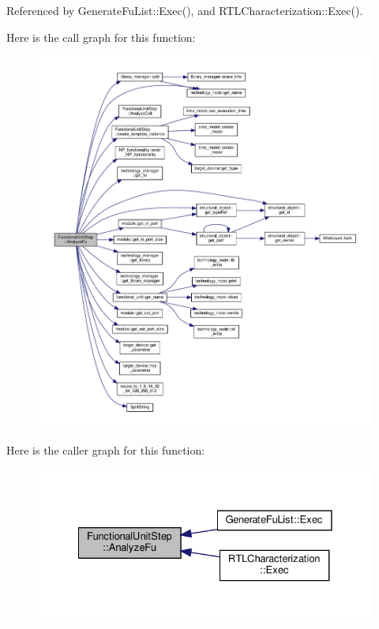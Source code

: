 Referenced by Generate\+Fu\+List\+::\+Exec(), and R\+T\+L\+Characterization\+::\+Exec().

Here is the call graph for this function\+:
\nopagebreak
\begin{figure}[H]
\begin{center}
\leavevmode
\includegraphics[width=350pt]{d0/db7/classFunctionalUnitStep_a2456178e681c87f30485f3658589615f_cgraph}
\end{center}
\end{figure}
Here is the caller graph for this function\+:
\nopagebreak
\begin{figure}[H]
\begin{center}
\leavevmode
\includegraphics[width=328pt]{d0/db7/classFunctionalUnitStep_a2456178e681c87f30485f3658589615f_icgraph}
\end{center}
\end{figure}
\mbox{\label{classFunctionalUnitStep_a49ddb30d5388317d1ca7b69455aaeff0}} 
